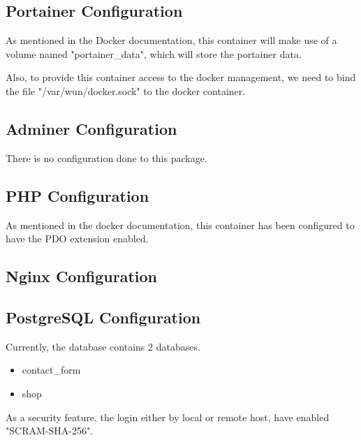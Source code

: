 \subsection{Portainer Configuration}\label{subsec:portainer-configuration}

\begin{flushleft}
    As mentioned in the Docker documentation, this container will make use of a volume named "portainer\_data", which
    will store the portainer data.
\end{flushleft}
\begin{flushleft}
    Also, to provide this container access to the docker management, we need to bind the file "/var/wun/docker.sock"
    to the docker container.
\end{flushleft}

\subsection{Adminer Configuration}\label{subsec:adminer-configuration}
\begin{flushleft}
    There is no configuration done to this package.
\end{flushleft}
\subsection{PHP Configuration}\label{subsec:PHH-configuration}
\begin{flushleft}
    As mentioned in the docker documentation, this container has been configured to have the PDO extension enabled.
\end{flushleft}
\subsection{Nginx Configuration}\label{subsec:nginx-configuration}

\subsection{PostgreSQL Configuration}\label{subsec:postgresql-configuration}
\begin{flushleft}
    Currently, the database contains 2 databases.
    \begin{itemize}
        \item contact\_form
        \item shop
    \end{itemize}
    As a security feature, the login either by local or remote host, have enabled "SCRAM-SHA-256".
\end{flushleft}
